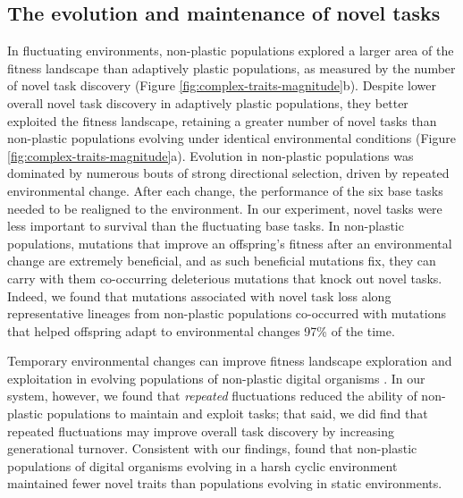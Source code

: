 \subsection{The evolution and maintenance of novel tasks}

In fluctuating environments, non-plastic populations explored a larger area of the fitness landscape than adaptively plastic populations, as measured by the number of novel task discovery (Figure \ref{fig:complex-traits-magnitude}b).
Despite lower overall novel task discovery in adaptively plastic populations, they better exploited the fitness landscape, retaining a greater number of novel tasks than non-plastic populations evolving under identical environmental conditions (Figure \ref{fig:complex-traits-magnitude}a).
Evolution in non-plastic populations was dominated by numerous bouts of strong directional selection, driven by repeated environmental change.
After each change, the performance of the six base tasks needed to be realigned to the environment. 
In our experiment, novel tasks were less important to survival than the fluctuating base tasks.
In non-plastic populations, mutations that improve an offspring's fitness after an environmental change are extremely beneficial, and as such beneficial mutations fix, they can carry with them co-occurring deleterious mutations that knock out novel tasks. 
Indeed, we found that mutations associated with novel task loss along representative lineages from non-plastic populations co-occurred with mutations that helped offspring adapt to environmental changes 97\% of the time.

Temporary environmental changes can improve fitness landscape exploration and exploitation in evolving populations of non-plastic digital organisms \citep{nahum_improved_2017}.
In our system, however, we found that \textit{repeated} fluctuations reduced the ability of non-plastic populations to maintain and exploit tasks; that said, we did find that repeated fluctuations may improve overall task discovery by increasing generational turnover. 
Consistent with our findings, \cite{canino-koning_fluctuating_2019} found that non-plastic populations of digital organisms evolving in a harsh cyclic environment maintained fewer novel traits than populations evolving in static environments.

